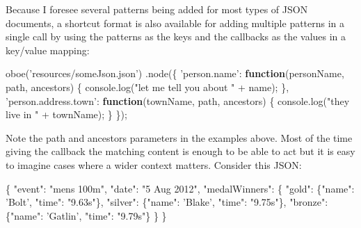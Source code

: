 \documentclass[]{article}
\newenvironment{Shaded}{}{}
\newcommand{\KeywordTok}[1]{\textcolor[rgb]{0.00,0.44,0.13}{\textbf{{#1}}}}
\newcommand{\StringTok}[1]{\textcolor[rgb]{0.25,0.44,0.63}{{#1}}}
\newcommand{\OtherTok}[1]{\textcolor[rgb]{0.00,0.44,0.13}{{#1}}}
\newcommand{\FunctionTok}[1]{\textcolor[rgb]{0.02,0.16,0.49}{{#1}}}
\newcommand{\NormalTok}[1]{{#1}}
\begin{document}
Because I foresee several patterns being added for most types of JSON
documents, a shortcut format is also available for adding multiple
patterns in a single call by using the patterns as the keys and the
callbacks as the values in a key/value mapping:

\begin{Shaded}
\begin{Highlighting}[]
\FunctionTok{oboe}\NormalTok{(}\StringTok{'resources/someJson.json'}\NormalTok{)}
   \NormalTok{.}\FunctionTok{node}\NormalTok{(\{  }
      \StringTok{'person.name'}\NormalTok{: }\KeywordTok{function}\NormalTok{(personName, path, ancestors) \{}
         \OtherTok{console}\NormalTok{.}\FunctionTok{log}\NormalTok{(}\StringTok{"let me tell you about "} \NormalTok{+ name);}
      \NormalTok{\},}
      \StringTok{'person.address.town'}\NormalTok{: }\KeywordTok{function}\NormalTok{(townName, path, ancestors) \{}
         \OtherTok{console}\NormalTok{.}\FunctionTok{log}\NormalTok{(}\StringTok{"they live in "} \NormalTok{+ townName);}
      \NormalTok{\}}
   \NormalTok{\});}
\end{Highlighting}
\end{Shaded}

Note the path and ancestors parameters in the examples above. Most of
the time giving the callback the matching content is enough to be able
to act but it is easy to imagine cases where a wider context matters.
Consider this JSON:

\begin{Shaded}
\begin{Highlighting}[]
\NormalTok{\{ }
   \StringTok{"event"}\NormalTok{: }\StringTok{"mens 100m"}\NormalTok{,}
   \StringTok{"date"}\NormalTok{: }\StringTok{"5 Aug 2012"}\NormalTok{,}
   \StringTok{"medalWinners"}\NormalTok{: \{}
      \StringTok{"gold"}\NormalTok{:     \{}\StringTok{"name"}\NormalTok{: }\StringTok{'Bolt'}\NormalTok{,    }\StringTok{"time"}\NormalTok{: }\StringTok{"9.63s"}\NormalTok{\},}
      \StringTok{"silver"}\NormalTok{:   \{}\StringTok{"name"}\NormalTok{: }\StringTok{'Blake'}\NormalTok{,   }\StringTok{"time"}\NormalTok{: }\StringTok{"9.75s"}\NormalTok{\},}
      \StringTok{"bronze"}\NormalTok{:   \{}\StringTok{"name"}\NormalTok{: }\StringTok{'Gatlin'}\NormalTok{,  }\StringTok{"time"}\NormalTok{: }\StringTok{"9.79s"}\NormalTok{\}}
   \NormalTok{\}}
\NormalTok{\}  }
\end{Highlighting}
\end{Shaded}
\end{document}
